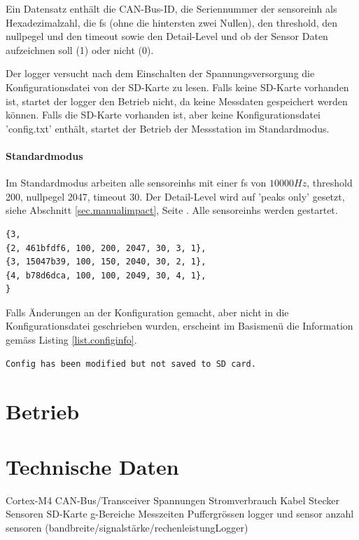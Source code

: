 Ein Datensatz enthält die CAN-Bus-ID, die Seriennummer der \gls{sensoreinh} als Hexadezimalzahl, die \gls{fs} (ohne die hintersten zwei Nullen), den \gls{threshold}, den \gls{nullpegel} und den \gls{timeout} sowie den Detail-Level und ob der Sensor Daten aufzeichnen soll (1) oder nicht (0).

Der \gls{logger} versucht nach dem Einschalten der Spannungsversorgung die Konfigurationsdatei von der SD-Karte zu lesen. Falls keine SD-Karte vorhanden ist, startet der \gls{logger} den Betrieb nicht, da keine Messdaten gespeichert werden können. Falls die SD-Karte vorhanden ist, aber keine Konfigurationsdatei 'config.txt' enthält, startet der Betrieb der Messstation im Standardmodus.

\paragraph{Standardmodus} Im Standardmodus arbeiten alle \glspl{sensoreinh} mit einer \gls{fs} von \ensuremath{10000 Hz}, \gls{threshold} 200, \gls{nullpegel} 2047, \gls{timeout} 30. Der Detail-Level wird auf 'peaks only' gesetzt, siehe Abschnitt \ref{sec.manualimpact}, Seite \pageref{sec.manualimpact}. Alle \glspl{sensoreinh} werden gestartet.

\begin{lstlisting}[caption=Beispiel einer Konfigurationsdatei, label=list.configfile]
{3,
{2, 461bfdf6, 100, 200, 2047, 30, 3, 1},
{3, 15047b39, 100, 150, 2040, 30, 2, 1},
{4, b78d6dca, 100, 100, 2049, 30, 4, 1},
}
\end{lstlisting}

Falls Änderungen an der Konfiguration gemacht, aber nicht in die Konfigurationsdatei geschrieben wurden, erscheint im Basismenü die Information gemäss Listing \ref{list.configinfo}.

\begin{lstlisting}[caption=Information bei ungespeicherter Konfiguration, label=list.configinfo]
Config has been modified but not saved to SD card.
\end{lstlisting}












\section{Betrieb}















\section{Technische Daten}
Cortex-M4
CAN-Bus/Transceiver
Spannungen
Stromverbrauch
Kabel
Stecker
Sensoren
SD-Karte
g-Bereiche
Messzeiten
Puffergrössen logger und sensor
anzahl sensoren (bandbreite/signalstärke/rechenleistungLogger)